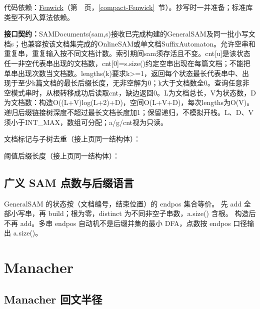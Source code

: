代码依赖：\hyperref[compact-Fenwick]{Fenwick}（第~\pageref{compact-Fenwick}~页，\ref{compact-Fenwick}~节）。抄写时一并准备；标准库类型不列入算法依赖。

{\sloppy{}\noindent\textbf{接口契约：}SAMDocuments(sam,s)接收已完成构建的GeneralSAM及同一批小写文档s；也兼容按该文档集完成的OnlineSAM或单文档SuffixAutomaton。允许空串和重复串，重复输入按不同文档计数。索引期间sam须存活且不变。cnt[u]是该状态任一非空代表串出现的文档数，cnt[0]=s.size()约定空串出现在每篇文档；不能把单串出现次数当文档数。lengths(k)要求k>=1，返回每个状态最长代表串中、出现于至少k篇文档的最长后缀长度，无非空解为0；k大于文档数全0。查询任意非空模式串时，从根转移成功后读取cnt，缺边返回0。L为文档总长，V为状态数，D为文档数：构造O((L+V)log(L+2)+D)，空间O(L+V+D)，每次lengths为O(V)。递归后缀链接树深度不超过最长文档长度加1；保留递归，不模拟开栈。L、D、V须小于INT\_MAX，数组可分配；a/g/cnt视为只读。\par}

\Needspace{122pt}



\newpage

\noindent 文档标记与子树去重（接上页同一结构体）：



\newpage

\noindent 阈值后缀长度（接上页同一结构体）：



\section{广义 SAM 点数与后缀语言}\label{knowledge-general-sam}
GeneralSAM 的状态按（文档编号，结束位置）的 endpos 集合等价。
先 add 全部小写串，再 build；根为零，distinct 为不同非空子串数，a.size() 含根。
构造后不再 add。多串 endpos 自动机不是后缀并集的最小 DFA，点数按 endpos 口径输出 a.size()。


\Needspace{587pt}

\chapter{Manacher}

\section{Manacher 回文半径}\label{compact-manacher}

